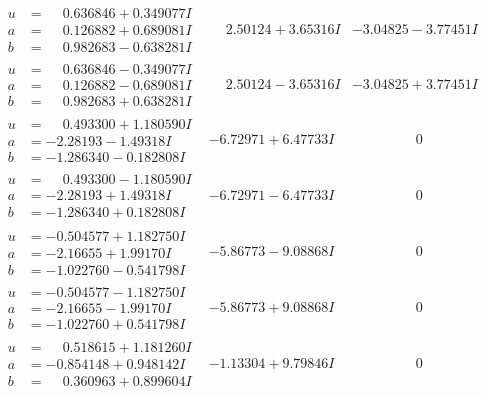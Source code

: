 \documentclass[1p]{elsarticle_modified}
\theoremstyle{definition}
\begin{document}
$$\begin{array}{c|c|c}
\begin{aligned}
u &= \phantom{-}0.636846 + 0.349077 I \\
a &= \phantom{-}0.126882 + 0.689081 I \\
b &= \phantom{-}0.982683 - 0.638281 I\end{aligned}
 & \phantom{-}2.50124 + 3.65316 I & -3.04825 - 3.77451 I \\ \hline\begin{aligned}
u &= \phantom{-}0.636846 - 0.349077 I \\
a &= \phantom{-}0.126882 - 0.689081 I \\
b &= \phantom{-}0.982683 + 0.638281 I\end{aligned}
 & \phantom{-}2.50124 - 3.65316 I & -3.04825 + 3.77451 I \\ \hline\begin{aligned}
u &= \phantom{-}0.493300 + 1.180590 I \\
a &= -2.28193 - 1.49318 I \\
b &= -1.286340 - 0.182808 I\end{aligned}
 & -6.72971 + 6.47733 I & \phantom{-0.000000 } 0 \\ \hline\begin{aligned}
u &= \phantom{-}0.493300 - 1.180590 I \\
a &= -2.28193 + 1.49318 I \\
b &= -1.286340 + 0.182808 I\end{aligned}
 & -6.72971 - 6.47733 I & \phantom{-0.000000 } 0 \\ \hline\begin{aligned}
u &= -0.504577 + 1.182750 I \\
a &= -2.16655 + 1.99170 I \\
b &= -1.022760 - 0.541798 I\end{aligned}
 & -5.86773 - 9.08868 I & \phantom{-0.000000 } 0 \\ \hline\begin{aligned}
u &= -0.504577 - 1.182750 I \\
a &= -2.16655 - 1.99170 I \\
b &= -1.022760 + 0.541798 I\end{aligned}
 & -5.86773 + 9.08868 I & \phantom{-0.000000 } 0 \\ \hline\begin{aligned}
u &= \phantom{-}0.518615 + 1.181260 I \\
a &= -0.854148 + 0.948142 I \\
b &= \phantom{-}0.360963 + 0.899604 I\end{aligned}
 & -1.13304 + 9.79846 I & \phantom{-0.000000 } 0 \\ \hline\begin{aligned}

\end{aligned}
\end{array}$$
\end{document}
